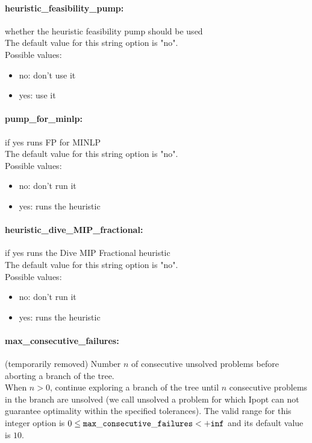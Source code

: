 \paragraph{heuristic\_feasibility\_pump:}\label{sec:heuristic_feasibility_pump} whether the heuristic feasibility pump should be used $\;$ \\

The default value for this string option is "no".
\\ 
Possible values:
\begin{itemize}
   \item no: don't use it
   \item yes: use it
\end{itemize}

\paragraph{pump\_for\_minlp:}\label{sec:pump_for_minlp} if yes runs FP for MINLP $\;$ \\

The default value for this string option is "no".
\\ 
Possible values:
\begin{itemize}
   \item no: don't run it
   \item yes: runs the heuristic
\end{itemize}

\paragraph{heuristic\_dive\_MIP\_fractional:}\label{sec:heuristic_dive_MIP_fractional} if yes runs the Dive MIP Fractional heuristic $\;$ \\

The default value for this string option is "no".
\\ 
Possible values:
\begin{itemize}
   \item no: don't run it
   \item yes: runs the heuristic
\end{itemize}

\paragraph{max\_consecutive\_failures:}\label{sec:max_consecutive_failures} (temporarily removed) Number $n$ of consecutive unsolved problems before aborting a branch of the tree. $\;$ \\
 When $n > 0$, continue exploring a branch of the
tree until $n$ consecutive problems in the branch
are unsolved (we call unsolved a problem for
which Ipopt can not guarantee optimality within
the specified tolerances). The valid range for this integer option is
$0 \le {\tt max\_consecutive\_failures } <  {\tt +inf}$
and its default value is $10$.


